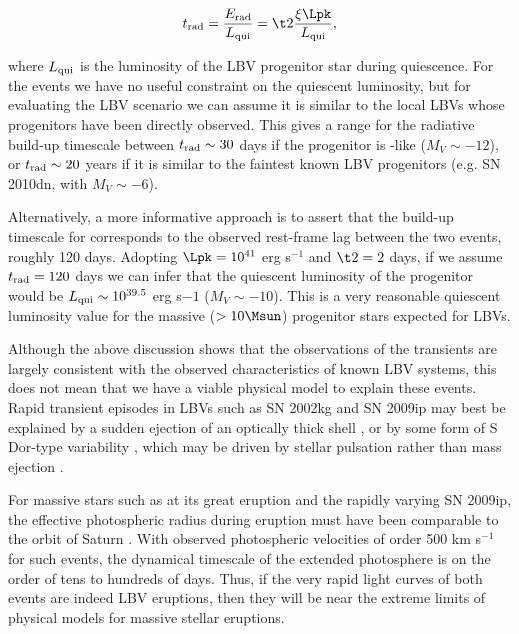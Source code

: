 \begin{equation}
  \label{eqn:trad}
t_{\rm rad} = \frac{E_{\rm rad}}{L_{\rm qui}} = \t2 \frac{\xi\Lpk}{L_{\rm qui}},
\end{equation}

\noindent where $L_{\rm qui}$ is the luminosity of the LBV progenitor
star during quiescence. For the \spock events we have no useful
constraint on the quiescent luminosity, but for evaluating the LBV
scenario we can assume it is similar to the local LBVs whose
progenitors have been directly observed.  This gives a range for the
radiative build-up timescale between $t_{\rm rad}\sim30$ days if the
progenitor is \etacar-like ($M_V\sim-12$), or $t_{\rm rad}\sim20$
years if it is similar to the faintest known LBV progenitors (e.g. SN
2010dn, with $M_V\sim-6$).  

Alternatively, a more informative approach is to assert that the
build-up timescale for \spock corresponds to the observed rest-frame
lag between the two events, roughly 120 days. Adopting $\Lpk=10^{41}$
erg s$^{-1}$ and $\t2=2$ days, if we assume $t_{\rm rad}=120$ days we
can infer that the quiescent luminosity of the \spock progenitor would
be $L_{\rm qui}\sim10^{39.5}$ erg s${-1}$ ($M_V\sim-10$).  This is a
very reasonable quiescent luminosity value for the massive
($>10\Msun$) progenitor stars expected for LBVs.

Although the above discussion shows that the observations of the
\spock transients are largely consistent with the observed
characteristics of known LBV systems, this does not mean that we have
a viable physical model to explain these events. Rapid transient
episodes in LBVs such as SN 2002kg and SN 2009ip may best be explained
by a sudden ejection of an optically thick shell
\citep[e.g.,][]{Smith:2010, Smith:2011b}, or by some form of S
Dor-type variability \citep{Weis:2005, VanDyk:2006, Foley:2011}, which
may be driven by stellar pulsation rather than mass ejection
\citep{VanGenderen:1997, VanGenderen:2001}.

For massive stars such as \etacar at its great eruption and the
rapidly varying SN 2009ip, the effective photospheric radius during
eruption must have been comparable to the orbit of Saturn
\citep[$10^{14}$ cm;][]{Davidson:1997, Smith:2011b, Foley:2011}.  With
observed photospheric velocities of order 500 km s$^{-1}$ for such
events, the dynamical timescale of the extended photosphere is on the
order of tens to hundreds of days.  Thus, if the very rapid light
curves of both \spock events are indeed LBV eruptions, then they will
be near the extreme limits of physical models for massive stellar
eruptions.

